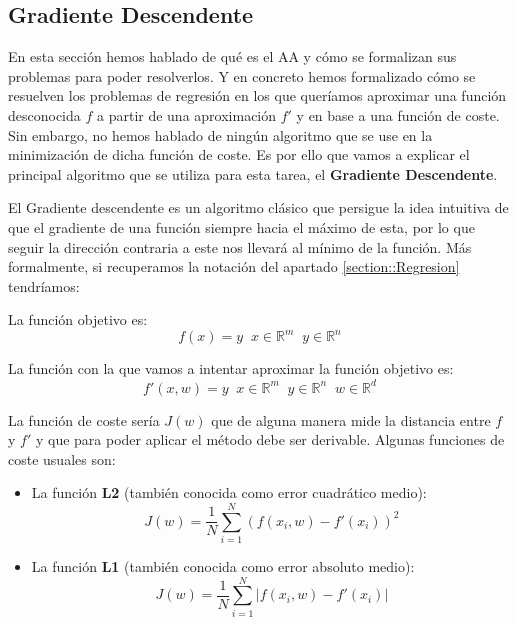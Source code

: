     \subsection{Gradiente Descendente}
        \noindent En esta sección hemos hablado de qué es el AA y cómo se formalizan sus problemas para poder resolverlos. Y en concreto hemos formalizado cómo se resuelven los problemas de regresión en los que queríamos aproximar una función desconocida $f$ a partir de una aproximación $f'$ y en base a una función de coste. Sin embargo, no hemos hablado de ningún algoritmo que se use en la minimización de dicha función de coste. Es por ello que vamos a explicar el principal algoritmo que se utiliza para esta tarea, el \textbf{Gradiente Descendente}. 

        \medskip

        \noindent El Gradiente descendente es un algoritmo clásico que persigue la idea intuitiva de que el gradiente de una función siempre  hacia el máximo de esta, por lo que seguir la dirección contraria a este nos llevará al mínimo de la función. Más formalmente, si recuperamos la notación del apartado \autoref{section::Regresion} tendríamos: 

        \medskip
        
        \noindent La función objetivo es: 
        \begin{equation}
            f(x)=y \; \; x \in \mathbb{R}^m \; \; y \in \mathbb{R}^n
        \end{equation}

        \noindent La función con la que vamos a intentar aproximar la función objetivo es:
        \begin{equation}
            f'(x,w)=y \; \; x \in \mathbb{R}^m \; \; y \in \mathbb{R}^n \; \; w \in \mathbb{R}^d 
        \end{equation}

        \noindent La función de coste sería $J(w)$ que de alguna manera mide la distancia entre $f$ y $f'$ y que para poder aplicar el método debe ser derivable. Algunas funciones de coste usuales son: 

        \begin{itemize}
            \item La función \textbf{L2} (también conocida como error cuadrático medio): 
            \begin{equation}
                J(w)=\frac{1}{N} \sum_{i=1}^N(f(x_i,w)-f'(x_i))^2
            \end{equation}
            \item La función \textbf{L1} (también conocida como error absoluto medio): 
            \begin{equation}
                J(w)=\frac{1}{N} \sum_{i=1}^N \left|f(x_i,w)-f'(x_i)\right|
            \end{equation}
        \end{itemize}

